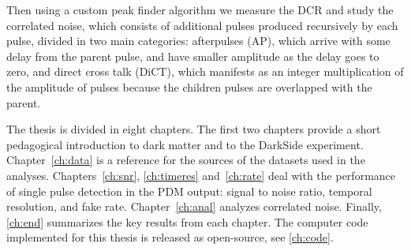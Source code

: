 Then using a custom peak finder algorithm we measure the DCR and study the
correlated noise, which consists of additional pulses produced recursively by
each pulse, divided in two main categories: afterpulses (AP), which arrive with
some delay from the parent pulse, and have smaller amplitude as the delay goes
to zero, and direct cross talk (DiCT), which manifests as an integer
multiplication of the amplitude of pulses because the children pulses are
overlapped with the parent.

The thesis is divided in eight chapters. The first two chapters provide a short
pedagogical introduction to dark matter and to the DarkSide experiment.
Chapter~\ref{ch:data} is a reference for the sources of the datasets used in
the analyses. Chapters~\ref{ch:snr}, \ref{ch:timeres} and~\ref{ch:rate} deal
with the performance of single pulse detection in the PDM output: signal to
noise ratio, temporal resolution, and fake rate. Chapter~\ref{ch:anal} analyzes
correlated noise. Finally, \autoref{ch:end} summarizes the key results from
each chapter. The computer code implemented for this thesis is released as
open-source, see \autoref{ch:code}.
